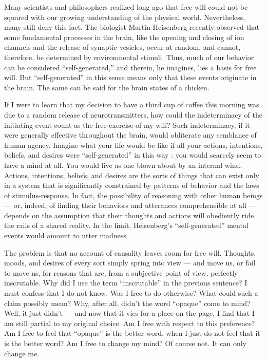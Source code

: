 \documentclass[a4paper,14pt]{extbook}
\begin{document}
Many scientists and philosophers realized long ago that free will could not be squared with our growing understanding of the physical world.
Nevertheless, many still deny this fact.
The biologist Martin Heisenberg recently observed that some fundamental processes in the brain, like the opening and closing of ion channels and the release of synaptic vesicles, occur at random, and cannot, therefore, be determined by environmental stimuli.
Thus, much of our behavior can be considered ``self-generated,'' and therein, he imagines, lies a basis for free will.
But ``self-generated'' in this sense means only that these events originate in the brain.
The same can be said for the brain states of a chicken.

If I were to learn that my decision to have a third cup of coffee this morning was due to a random release of neurotransmitters, how could the indeterminacy of the initiating event count as the free exercise of my will?
Such indeterminacy, if it were generally effective throughout the brain, would obliterate any semblance of human agency.
Imagine what your life would be like if all your actions, intentions, beliefs, and desires were ``self-generated'' in this way :
you would scarcely seem to have a mind at all.
You would live as one blown about by an internal wind.
Actions, intentions, beliefs, and desires are the sorts of things that can exist only in a system that is significantly constrained by patterns of behavior and the laws of stimulus-response.
In fact, the possibility of reasoning with other human beings --- or, indeed, of finding their behaviors and utterances comprehensible at all --- depends on the assumption that their thoughts and actions will obediently ride the rails of a shared reality.
In the limit, Heisenberg’s ``self-generated'' mental events would amount to utter madness.

The problem is that no account of causality leaves room for free will.
Thoughts, moods, and desires of every sort simply spring into view --- and move us, or fail to move us, for reasons that are, from a subjective point of view, perfectly inscrutable.
Why did I use the term ``inscrutable'' in the previous sentence?
I must confess that I do not know.
Was I free to do otherwise?
What could such a claim possibly mean?
Why, after all, didn’t the word ``opaque'' come to mind?
Well, it just didn’t --- and now that it vies for a place on the page, I find that I am still partial to my original choice.
Am I free with respect to this preference?
Am I free to feel that ``opaque'' is the better word, when I just do not feel that it is the better word?
Am I free to change my mind?
Of course not.
It can only change me.
\end{document}
